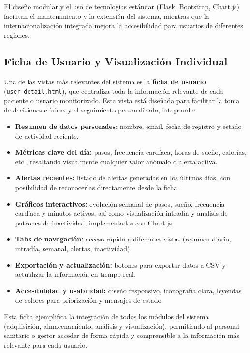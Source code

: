 El diseño modular y el uso de tecnologías estándar (Flask, Bootstrap, Chart.js) facilitan el mantenimiento y la extensión del sistema, mientras que la internacionalización integrada mejora la accesibilidad para usuarios de diferentes regiones.

\subsection*{Ficha de Usuario y Visualización Individual}
Una de las vistas más relevantes del sistema es la \textbf{ficha de usuario} (\texttt{user\_detail.html}), que centraliza toda la información relevante de cada paciente o usuario monitorizado. Esta vista está diseñada para facilitar la toma de decisiones clínicas y el seguimiento personalizado, integrando:

\begin{itemize}
    \item \textbf{Resumen de datos personales:} nombre, email, fecha de registro y estado de actividad reciente.
    \item \textbf{Métricas clave del día:} pasos, frecuencia cardíaca, horas de sueño, calorías, etc., resaltando visualmente cualquier valor anómalo o alerta activa.
    \item \textbf{Alertas recientes:} listado de alertas generadas en los últimos días, con posibilidad de reconocerlas directamente desde la ficha.
    \item \textbf{Gráficos interactivos:} evolución semanal de pasos, sueño, frecuencia cardíaca y minutos activos, así como visualización intradía y análisis de patrones de inactividad, implementados con Chart.js.
    \item \textbf{Tabs de navegación:} acceso rápido a diferentes vistas (resumen diario, intradía, semanal, alertas, inactividad).
    \item \textbf{Exportación y actualización:} botones para exportar datos a CSV y actualizar la información en tiempo real.
    \item \textbf{Accesibilidad y usabilidad:} diseño responsivo, iconografía clara, leyendas de colores para priorización y mensajes de estado.
\end{itemize}

Esta ficha ejemplifica la integración de todos los módulos del sistema (adquisición, almacenamiento, análisis y visualización), permitiendo al personal sanitario o gestor acceder de forma rápida y comprensible a la información más relevante para cada usuario.


